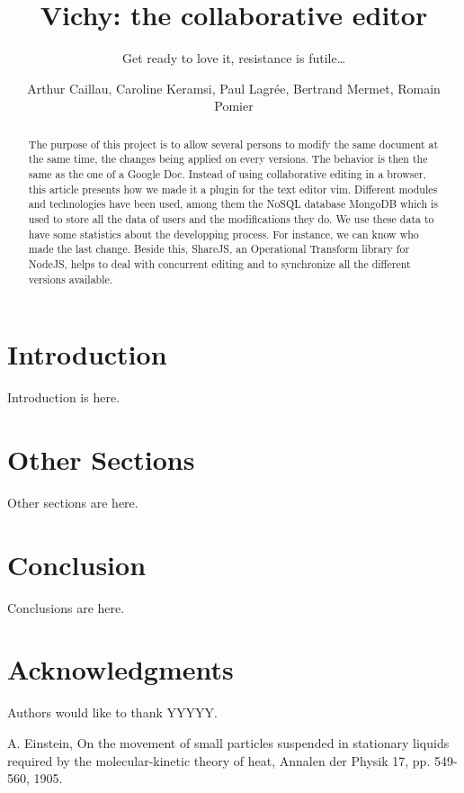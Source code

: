 \documentclass{llncs}
\begin{document}
\title{Vichy: the collaborative editor}
\subtitle{Get ready to love it, resistance is futile\ldots}

\author{Arthur Caillau, Caroline Keramsi, Paul Lagrée, Bertrand Mermet, Romain Pomier}

\maketitle

\begin{abstract}

The purpose of this project is to allow several persons to modify the same document at the same time, the changes being applied on every versions. The behavior is then the same as the one of a Google Doc. Instead of using collaborative editing in a browser, this article presents how we made it a plugin for the text editor vim. Different modules and technologies have been used, among them the NoSQL database MongoDB which is used to store all the data of users and the modifications they do. We use these data to have some statistics about the developping process. For instance, we can know who made the last change. Beside this, ShareJS, an Operational Transform library for NodeJS, helps to deal with concurrent editing and to synchronize all the different versions available. 

\end{abstract}

\section{Introduction}\label{sec:Introduction}

Introduction is here.

\section{Other Sections}\label{sec:Others}

Other sections are here. 


\section{Conclusion}\label{sec:Conclusion}

Conclusions are here.

\section*{Acknowledgments}\label{sec:Acknowledgments}

Authors would like to thank YYYYY.

\begin{thebibliography}{1}

A. Einstein, On the movement of small particles suspended in stationary liquids required by the molecular-kinetic theory of heat, Annalen der Physik 17, pp. 549-560, 1905.

\end{thebibliography}
\end{document}
